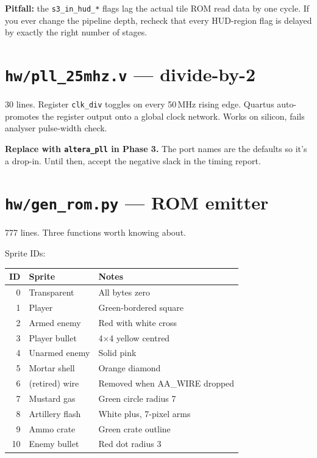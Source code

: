 \documentclass[11pt,letterpaper]{article}
\begin{document}
\textbf{Pitfall:} the \texttt{s3\_in\_hud\_*} flags lag the actual tile ROM
read data by one cycle. If you ever change the pipeline depth, recheck that
every HUD-region flag is delayed by exactly the right number of stages.

\section{\texttt{hw/pll\_25mhz.v} --- divide-by-2}

30 lines. Register \texttt{clk\_div} toggles on every 50\,MHz rising edge.
Quartus auto-promotes the register output onto a global clock network.
Works on silicon, fails analyser pulse-width check.

\textbf{Replace with \texttt{altera\_pll} in Phase 3.} The port names are
the defaults so it's a drop-in. Until then, accept the negative slack in
the timing report.

\section{\texttt{hw/gen\_rom.py} --- ROM emitter}

777 lines. Three functions worth knowing about.

Sprite IDs:

\begin{table}[h]
\centering
\begin{tabular}{rll}
\toprule
ID & Sprite & Notes \\
\midrule
0 & Transparent & All bytes zero \\
1 & Player & Green-bordered square \\
2 & Armed enemy & Red with white cross \\
3 & Player bullet & 4$\times$4 yellow centred \\
4 & Unarmed enemy & Solid pink \\
5 & Mortar shell & Orange diamond \\
6 & (retired) wire & Removed when AA\_WIRE dropped \\
7 & Mustard gas & Green circle radius 7 \\
8 & Artillery flash & White plus, 7-pixel arms \\
9 & Ammo crate & Green crate outline \\
10 & Enemy bullet & Red dot radius 3 \\
\bottomrule
\end{tabular}
\end{table}
\end{document}
